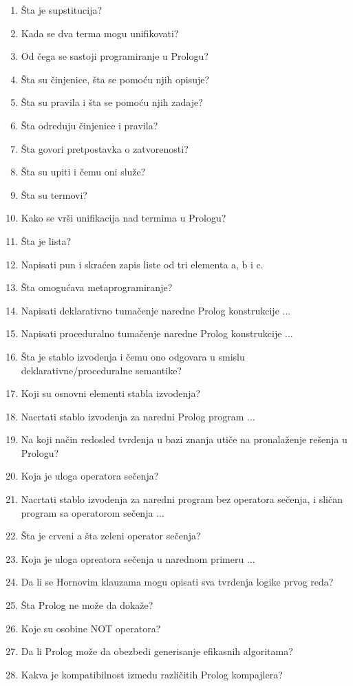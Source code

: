 \documentclass[main.tex]{subfiles}
\begin{document}
\begin{multicols}{2}
\begin{enumerate}
\item Šta je supstitucija?
\item Kada se dva terma mogu unifikovati?
\item Od čega se sastoji programiranje u Prologu?
\item Šta su činjenice, šta se pomoću njih opisuje?
\item Šta su pravila i šta se pomoću njih zadaje?
\item Šta odreduju činjenice i pravila?
\item Šta govori pretpostavka o zatvorenosti?
\item Šta su upiti i čemu oni služe?
\item Šta su termovi?
\item Kako se vrši unifikacija nad termima u Prologu?
\item Šta je lista?
\item Napisati pun i skraćen zapis liste od tri elementa a, b i c.
\item Šta omogućava metaprogramiranje?
\item Napisati deklarativno tumačenje naredne Prolog konstrukcije ...
\item Napisati proceduralno tumačenje naredne Prolog konstrukcije ...
\item Šta je stablo izvodenja i čemu ono odgovara u smislu deklarativne/proceduralne
semantike?
\item Koji su osnovni elementi stabla izvodenja?
\item Nacrtati stablo izvodenja za naredni Prolog program ...
\item Na koji način redosled tvrdenja u bazi znanja utiče na pronalaženje rešenja
u Prologu?
\item Koja je uloga operatora sečenja?
\item Nacrtati stablo izvodenja za naredni program bez operatora sečenja, i
sličan program sa operatorom sečenja ...
\item Šta je crveni a šta zeleni operator sečenja?
\item Koja je uloga opreatora sečenja u narednom primeru ...
\item Da li se Hornovim klauzama mogu opisati sva tvrdenja logike prvog reda?
\item Šta Prolog ne može da dokaže?
\item Koje su osobine NOT operatora?
\item Da li Prolog može da obezbedi generisanje efikasnih algoritama?
\item Kakva je kompatibilnost izmedu različitih Prolog kompajlera?

\end{enumerate}
\end{multicols}
\end{document}
